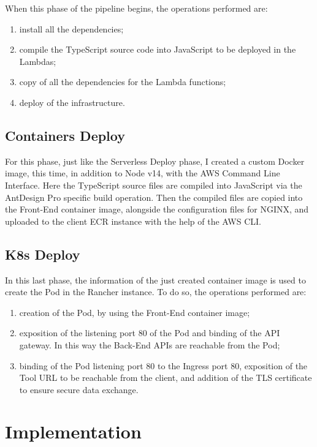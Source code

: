 When this phase of the pipeline begins, the operations performed are:
\begin{enumerate}
    \item install all the dependencies;
    \item compile the TypeScript source code into JavaScript to be deployed in the Lambdas;
    \item copy of all the dependencies for the Lambda functions; 
    \item deploy of the infrastructure.
\end{enumerate}

\subsection{Containers Deploy}
For this phase, just like the Serverless Deploy phase, I created a custom Docker image, this time, in addition to Node v14, with the AWS Command Line Interface. Here the TypeScript source files are compiled into JavaScript via the AntDesign Pro specific build operation. Then the compiled files are copied into the Front-End container image, alongside the configuration files for NGINX, and uploaded to the client ECR instance with the help of the AWS CLI.


\subsection{K8s Deploy}
In this last phase, the information of the just created container image is used to create the Pod in the Rancher instance. To do so, the operations performed are:
\begin{enumerate}
    \item creation of the Pod, by using the Front-End container image;
    \item exposition of the listening port 80 of the Pod and binding of the API gateway. In this way the Back-End APIs are reachable from the Pod;
    \item binding of the Pod listening port 80 to the Ingress port 80, exposition of the Tool URL to be reachable from the client, and addition of the TLS certificate to ensure secure data exchange.
\end{enumerate}


\section{Implementation}

